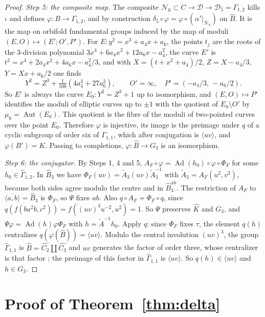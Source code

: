 \documentclass[11pt,a4paper]{article}
\theoremstyle{plain}
\theoremstyle{definition}
\theoremstyle{remark}
\newcommand{\Bh}{\widehat B}
\newcommand{\Gh}{\widehat\Gamma}
\newcommand{\Ad}{\operatorname{Ad}}
\newcommand{\Aut}{\operatorname{Aut}}
\newcommand{\ab}{\mathrm{ab}}
\begin{document}
\begin{proof}
\emph{Step 5: the composite map.} The composite
$\mathcal N_0\subset C\to\mathcal D\to\mathcal D_5=\Gamma_{1,2}$ kills $\iota$ and defines $\varphi:B\to\Gamma_{1,2}$,
and by construction $\delta_5\circ\varphi=\varphi\circ(\alpha'|_{\overline{\mathcal N_0}})$ on $\Bh$. It is the map
on orbifold fundamental groups induced by the map of moduli $(E,O)\mapsto(E';O',P')$. For
$E:y^2=x^3+a_4x+a_6$, the points $t_j$ are the roots of the $3$-division polynomial
$3x^4+6a_4x^2+12a_6x-a_4^2$, the curve $E'$ is $t^2=x^4+2a_4x^2+4a_6x-a_4^2/3$, and with
$X=(t+x^2+a_4)/2$, $Z=X-a_4/3$, $Y=Xx+a_6/2$ one finds
\[
 Y^2=Z^3+\tfrac1{108}(4a_4^3+27a_6^2),\qquad O'=\infty,\quad P'=(-a_4/3,\,-a_6/2).
\]
So $E'$ is always the curve $E_0:Y^2=Z^3+1$ up to isomorphism, and $(E,O)\mapsto P'$ identifies the moduli of
elliptic curves up to $\pm1$ with the quotient of $E_0\setminus O'$ by $\mu_6=\Aut(E_0)$. This quotient is the fibre
of the moduli of two-pointed curves over the point $E_0$. Therefore $\varphi$ is injective, its image is the
preimage under $q$ of a cyclic subgroup of order six of $\Gamma_{1,1}$, which after conjugation is
$\langle uv\rangle$, and $\varphi(B')=K$. Passing to completions, $\varphi:\Bh\to G_3$ is an isomorphism.

\emph{Step 6: the conjugator.} By Steps 1, 4 and 5, $A_F\circ\varphi=\Ad(h_0)\circ\varphi\circ\Phi_F$ for some
$h_0\in\Gh_{1,2}$. In $\Bh_3$ we have $\Phi_F(uv)=\tilde A_3(uv)\tilde A_3^{-1}$ with $\tilde A_3=A_F(u^2,v^2)$,
because both sides agree modulo the centre and in $\Bh_3^{\ab}$. The restriction of $A_F$ to
$\overline{\langle a,b\rangle}=\Bh_3$ is $\Phi_F$, so $\Psi$ fixes $ab$. Also $q\circ A_F=\Phi_F\circ q$, since
$q(f(ba^2b,c^2))=f((uv)^3u^{-2},u^2)=1$. So $\Psi$ preserves $\widehat K$ and $G_3$, and
$\Psi\varphi=\Ad(h)\varphi\Phi_F$ with $h=\tilde A^{-1}h_0$. Apply $q$: since $\Phi_F$ fixes $\tau$, the element
$q(h)$ centralizes $q(\varphi(\Bh))=\langle uv\rangle$. Modulo the central involution
$(uv)^3$, the group $\Gh_{1,1}$ is $\Bh=\widehat{C_2}\amalg\widehat{C_3}$ and $uv$ generates the factor of order
three, whose centralizer is that factor \cite{HR}; the preimage of this factor in $\Gh_{1,1}$ is
$\langle uv\rangle$. So $q(h)\in\langle uv\rangle$ and $h\in G_3$.
\end{proof}

\section{Proof of Theorem~\ref{thm:delta}}\label{sec:proof}
\end{document}
